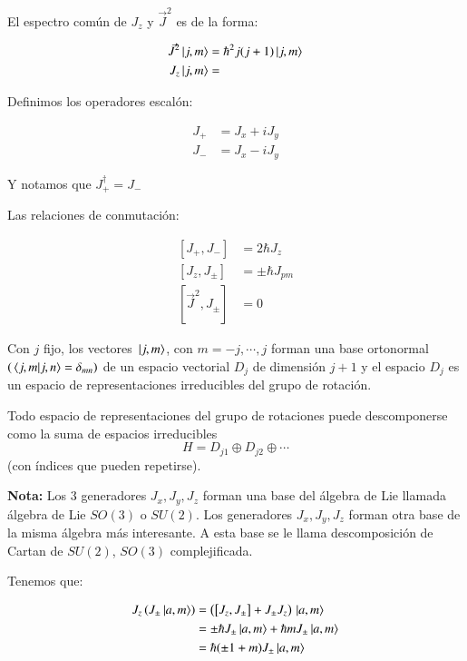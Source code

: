 El espectro común de $J_z$ y $\vec{J}^2$ es de la forma:

\begin{align}
    \vec{J}^2\ket{j,m}&=\hbar^2j(j+1)\ket*{j,m}\\
    J_z\ket*{j,m}&=
\end{align}

Definimos los operadores escalón:

\begin{align*}
    J_+&=J_x+iJ_y\\
    J_-&=J_x-iJ_y
\end{align*}

Y notamos que $J_+^\dagger=J_-$

Las relaciones de conmutación:

\begin{align*}
    \left[J_+,J_-\right]&=2\hbar J_z\\
    \left[J_z,J_\pm\right]&=\pm \hbar J_{pm}\\
    \left[\vec{J}^2,J_{\pm}\right]&=0
\end{align*}

\medskip


Con $j$ fijo, los vectores $\ket*{j,m}$, con $m=-j,\cdots,j$ forman una base ortonormal $(\bra*{j,m}\ket*{j,n}=\delta_{mn})$ de un espacio vectorial $D_j$ de dimensión $j+1$ y el espacio $D_j$ es un espacio de representaciones irreducibles del grupo de rotación.

Todo espacio de representaciones del grupo de rotaciones puede descomponerse como la suma de espacios irreducibles $$H=D_{j1} \oplus D_{j2} \oplus\cdots$$ (con índices que pueden repetirse).

\bigskip

\hspace{1cm}\textbf{Nota:} Los 3 generadores $J_x,J_y,J_z$ forman una base del álgebra de Lie llamada álgebra de Lie $SO(3)$ o $SU(2)$. Los generadores $J_x,J_y,J_z$ forman otra base de la misma álgebra más interesante. A esta base se le llama descomposición de Cartan de $SU(2)$, $SO(3)$ complejificada.

Tenemos que:

\begin{align*}
    J_z\left(J_\pm \ket*{a,m}\right)
        &=\left(\left[J_z,J_\pm\right]+J_\pm J_z\right)\ket*{a,m}\\
        &=\pm \hbar J_\pm \ket*{a,m}+\hbar mJ_\pm\ket*{a,m}\\
        &=\hbar(\pm1+m)J_\pm\ket*{a,m}
\end{align*}

